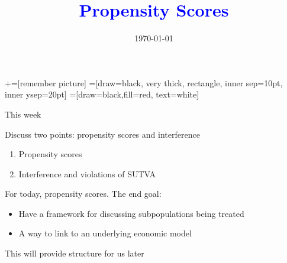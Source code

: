 \documentclass[notes,11pt, aspectratio=169]{beamer}
\title[]{\textcolor{blue}{Propensity Scores}}
\author[PGP]{}
\institute[FRBNY]{\small{Paul Goldsmith-Pinkham}}
\date{\today}
\newenvironment{wideitemize}{\itemize\addtolength{\itemsep}{10pt}}{\enditemize}
\begin{document}
\newcommand\marktopleft[1]{%
    \tikz[overlay,remember picture] 
        \node (marker-#1-a) at (-.3em,.3em) {};%
}
\newcommand\markbottomright[2]{%
    \tikz[overlay,remember picture] 
        \node (marker-#1-b) at (0em,0em) {};%
}
+=[remember picture] 
 =[draw=black, very thick, rectangle, inner sep=10pt, inner ysep=20pt]
 =[draw=black,fill=red, text=white]

\begin{frame}
\maketitle

\end{frame}

\begin{frame}{This week}
 
  \begin{wideitemize}
  \item  Discuss two points: propensity scores and interference
    \begin{enumerate}
    \item Propensity scores
    \item Interference and violations of SUTVA
    \end{enumerate}
  \item For today, propensity scores. The end goal: 
    \begin{itemize}
    \item Have a framework for discussing subpopulations
      being treated
    \item A way to link to an underlying economic model
    \end{itemize}
  \item This will provide structure for us later
  \end{wideitemize}
\end{frame}
\end{document}
